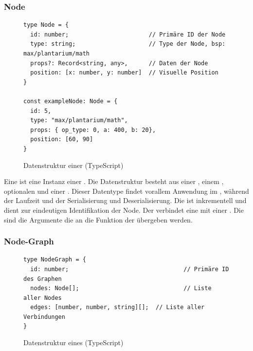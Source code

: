 \documentclass[ngerman]{article}
\begin{document}
\subsubsection*{Node}

\begin{figure}[htbp]
  \begin{code}
    \begin{verbatim}
type Node = {
  id: number;                       // Primäre ID der Node
  type: string;                     // Type der Node, bsp: max/plantarium/math
  props?: Record<string, any>,      // Daten der Node
  position: [x: number, y: number]  // Visuelle Position
}

const exampleNode: Node = {
  id: 5,
  type: "max/plantarium/math",
  props: { op_type: 0, a: 400, b: 20},
  position: [60, 90]
}

    \end{verbatim}
  \end{code}

  \caption{Datenstruktur einer  (TypeScript)}
  \label{fig:data_node}

\end{figure}

Eine  ist eine Instanz einer . Die Datenstruktur besteht aus einer , einem , optionalen  und einer . 
Dieser Datentype findet vorallem Anwendung im , während der Laufzeit und der Serialisierung und Deserialisierung.
\br
Die  ist inkrementell und dient zur eindeutigen Identifikation der Node. Der  verbindet eine  mit einer .
Die  sind die Argumente die an die  Funktion der  übergeben werden.

\subsubsection*{Node-Graph}

\begin{figure}[htbp]
  \begin{code}
    \begin{verbatim}
type NodeGraph = {
  id: number;                                 // Primäre ID des Graphen
  nodes: Node[];                              // Liste aller Nodes
  edges: [number, number, string][];  // Liste aller Verbindungen
}
    \end{verbatim}
  \end{code}

  \caption{Datenstruktur eines  (TypeScript)}
  \label{fig:data_node_graph}

\end{figure}
\end{document}
